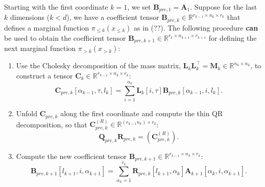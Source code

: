 \begin{prop}
	Starting with the first coordinate $k = 1$, we set $\bm{B}_{pre,1} = \bm{A}_1$. Suppose for the last $k$ dimensions ($k < d$), we have a coefficient tensor $\bm{B}_{pre,k} \in \mathbb{R}^{r_{k-1} \times n_k \times r_k}$ that defines a marginal function $\pi_{\leq k}(x_{\leq k})$ as in (??). The following procedure \textbf{can} be used to obtain the coefficient tensor $\bm{B}_{pre,k+1} \in \mathbb{R}^{r_{k} \times n_{k+1} \times r_{k+1}}$ for defining the next marginal function $\pi_{>k}(x_{>k})$:
	\begin{enumerate}
		\item Use the Cholesky decomposition of the mass matrix, $\bm{L}_k \bm{L}_k^\top = \bm{M}_k \in \mathbb{R}^{n_k \times n_k}$, to construct a tensor $\bm{C}_k \in \mathbb{R}^{r_{k-1} \times n_k \times r_k}$:
		\begin{equation}
			\bm{C}_{pre,k}[\alpha_{k-1}, \tau, l_k] = \sum_{i=1}^{n_k} \bm{L}_k[i, \tau] \bm{B}_{pre,k}[\alpha_{k-1}, i, l_k] .
		\end{equation}
		\item Unfold $\bm{C}_{pre,k}$ along the first coordinate and compute the thin QR decomposition, so that $\bm{C}_{pre,k}^{(R)} \in \mathbb{R}^{(r_{k-1} n_k ) \times r_k}$:
		\begin{equation}
			\bm{Q}_{pre,k}\bm{R}_{pre,k} = {(\bm{C}_{pre,k}^{(R)})}.
		\end{equation}
		\item Compute the new coefficient tensor $\bm{B}_{pre, k+1} \in \mathbb{R}^{r_{k-1} \times n_k \times r_k} $:
		\begin{equation}
			\bm{B}_{pre, k+1}[l_{k+1}, i, \alpha_{k+1}] = \sum_{\alpha_{k}=1}^{r_{k}} \bm{R}_{pre,k}[l_{k+1}, \alpha_{k}] \bm{A}_{k+1}[\alpha_{k}, i, \alpha_{k+1}] .
		\end{equation}
	\end{enumerate}
\end{prop}
